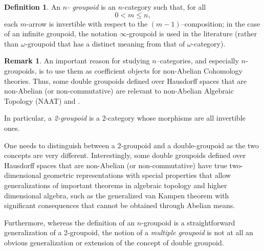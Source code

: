 \documentclass[12pt]{article}
\theoremstyle{plain}
\theoremstyle{definition}
\newtheorem{definition}{Definition}[section]
\newtheorem{remark}{Remark}[section]
\numberwithin{equation}{section}
\begin{document}
\begin{definition}
An \emph{$n$- groupoid} is an $n$-category such that, for all 
$$0 < m \leq n,$$  each $m$-arrow is invertible with respect to the $(m-1)$--composition; in the case of an infinite groupoid, the notation $\infty$-groupoid is used in the literature 
 (rather than $\omega$-groupoid that has a distinct meaning from that of $\omega$-category).  

\end{definition}

\begin{remark}

 An important reason for studying $n$--categories, and especially 
$n$-groupoids, is to use them as coefficient objects for non-Abelian Cohomology theories. Thus, some double groupoids defined over Hausdorff spaces that are non-Abelian (or non-commutative) are relevant to non-Abelian Algebraic Topology (NAAT) and .


 In particular, a {\em 2-groupoid} is a 2-category whose morphisms are all invertible
ones. 

 One needs to distinguish between a 2-groupoid and a double-groupoid as the two concepts are very different.  Interestingly, some double groupoids defined over Hausdorff spaces that are non-Abelian (or non-commutative) have true two-dimensional geometric representations with special properties that allow generalizations of important theorems in algebraic topology and higher dimensional algebra, such as the generalized van Kampen theorem with significant consequences that cannot be obtained through Abelian means.

 Furthermore, whereas the definition of an $n$-groupoid is a straightforward generalization of a 2-groupoid, the notion of a \emph{multiple groupoid} is not at all an obvious generalization or extension of the concept of double groupoid. 
\end{remark}

\end{document}
